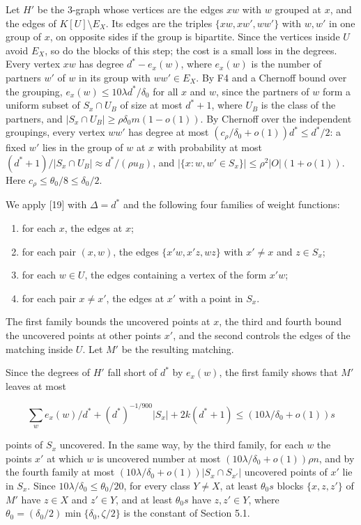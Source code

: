 \documentclass[english,11pt,a4paper]{article}
\providecommand{\tightlist}{\setlength{\itemsep}{0pt}\setlength{\parskip}{0pt}}
\begin{document}
Let \(H'\) be the 3-graph whose vertices are the edges \(xw\) with \(w\) grouped at \(x\), and the edges of \(K[U]\setminus E_X\). Its edges are the triples \(\{xw,xw',ww'\}\) with \(w,w'\) in one group of \(x\), on opposite sides if the group is bipartite. Since the vertices inside \(U\) avoid \(E_X\), so do the blocks of this step; the cost is a small loss in the degrees. Every vertex \(xw\) has degree \(d^*-e_x(w)\), where \(e_x(w)\) is the number of partners \(w'\) of \(w\) in its group with \(ww'\in E_X\). By F4 and a Chernoff bound over the grouping, \(e_x(w)\le10\lambda d^*/\delta_0\) for all \(x\) and \(w\), since the partners of \(w\) form a uniform subset of \(S_x\cap U_B\) of size at most \(d^*+1\), where \(U_B\) is the class of the partners, and \(|S_x\cap U_B|\ge\rho\delta_0m(1-o(1))\). By Chernoff over the independent groupings, every vertex \(ww'\) has degree at most \((c_\rho/\delta_0+o(1))d^*\le d^*/2\): a fixed \(w'\) lies in the group of \(w\) at \(x\) with probability at most \((d^*+1)/|S_x\cap U_B|\approx d^*/(\rho u_B)\), and \(|\{x:w,w'\in S_x\}|\le\rho^2|O|(1+o(1))\). Here \(c_\rho\le\theta_0/8\le\delta_0/2\).

We apply {[}19{]} with \(\Delta=d^*\) and the following four families of weight functions:

\begin{enumerate}
\def\labelenumi{\arabic{enumi}.}
\tightlist
\item
  for each \(x\), the edges at \(x\);
\item
  for each pair \((x,w)\), the edges \(\{x'w,x'z,wz\}\) with \(x'\ne x\) and \(z\in S_x\);
\item
  for each \(w\in U\), the edges containing a vertex of the form \(x'w\);
\item
  for each pair \(x\ne x'\), the edges at \(x'\) with a point in \(S_x\).
\end{enumerate}

The first family bounds the uncovered points at \(x\), the third and fourth bound the uncovered points at other points \(x'\), and the second controls the edges of the matching inside \(U\). Let \(M'\) be the resulting matching.

Since the degrees of \(H'\) fall short of \(d^*\) by \(e_x(w)\), the first family shows that \(M'\) leaves at most

\nopagebreak[4]
\[\sum_w e_x(w)/d^*+(d^*)^{-1/900}|S_x|+2k(d^*+1)\le(10\lambda/\delta_0+o(1))s\]

points of \(S_x\) uncovered. In the same way, by the third family, for each \(w\) the points \(x'\) at which \(w\) is uncovered number at most \((10\lambda/\delta_0+o(1))\rho n\), and by the fourth family at most \((10\lambda/\delta_0+o(1))|S_x\cap S_{x'}|\) uncovered points of \(x'\) lie in \(S_x\). Since \(10\lambda/\delta_0\le\theta_0/20\), for every class \(Y\ne X\), at least \(\theta_0s\) blocks \(\{x,z,z'\}\) of \(M'\) have \(z\in X\) and \(z'\in Y\), and at least \(\theta_0s\) have \(z,z'\in Y\), where \(\theta_0=(\delta_0/2)\min\{\delta_0,\zeta/2\}\) is the constant of Section 5.1.
\end{document}
